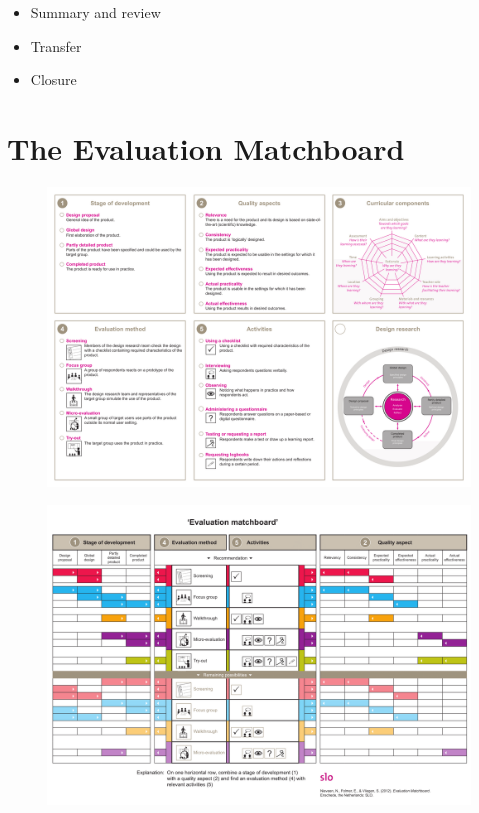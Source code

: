 \documentclass[11pt,twoside]{report} %
\begin{document}
\begin{itemize}
	\item Summary and review
	\item Transfer
	\item Closure
\end{itemize}

\newpage

\section{The Evaluation Matchboard}
\label{app:evamatchboard}

\begin{figure}[h]
\centering
\includegraphics[angle=90, width=.85\textwidth]{Evaluation_matchboard-1}
\end{figure}

\begin{figure}[h]
\centering
\includegraphics[angle=90, width=.85\textwidth]{Evaluation_matchboard-2}
\end{figure}
\end{document}
